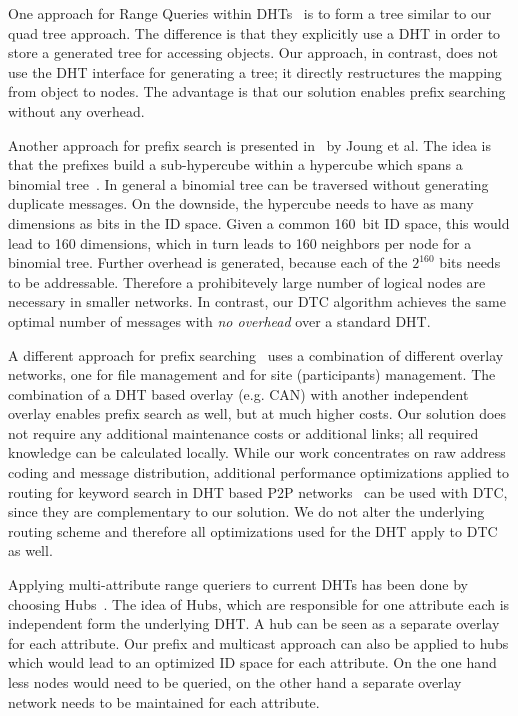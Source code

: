 \documentclass[fleqn,12pt,twoside]{article}
\begin{document}
One approach for Range Queries within DHTs~\cite{data-prefix} is to form a tree similar to
our quad tree approach. The difference is that they explicitly use a
DHT in order to store a generated tree for accessing objects. Our
approach, in contrast, does not use the DHT interface for generating a
tree; it directly restructures the mapping from object to nodes. The
advantage is that our solution enables prefix searching without any
overhead.

Another approach for prefix search is presented
in~\cite{10.1109/P2P.2006.24} by Joung et al. The idea is that the 
prefixes build a sub-hypercube within a hypercube which spans a
binomial tree~\cite{10.1109/ICDCS.2005.44}. In general a binomial tree
can be traversed without generating duplicate messages. On the
downside, the hypercube needs to have as many dimensions as bits in
the ID space. Given a common 160~bit ID space, this would lead to 160
dimensions, which in turn leads to 160 neighbors per node for a
binomial tree. Further overhead is generated, because each of the
$2^{160}$ bits needs to be addressable. Therefore a prohibitevely large
number of logical nodes are necessary in smaller networks. In
contrast, our DTC algorithm achieves the same optimal number of
messages with \emph{no overhead} over a standard DHT.

A different approach for prefix searching~\cite{872053}  uses
a combination of different overlay networks, one  for file
management and for site (participants) management.  The
combination of a DHT based overlay (e.g. CAN) with another independent
overlay enables prefix search as well, but at much higher costs. Our
solution does not require any additional maintenance costs or
additional links; all required knowledge can be calculated locally.
While our work concentrates on raw address coding and message
distribution, additional performance optimizations applied to routing
for keyword search in DHT based P2P
networks~\cite{reynolds2003epp,gnawali2002kss} can be used with DTC,
since they are complementary to our solution. We do not alter the
underlying routing scheme and therefore all optimizations used for the
DHT apply to DTC as well.

Applying multi-attribute range queriers to current DHTs has been done by choosing Hubs~\cite{bharambe2004mss}.
The idea of Hubs, which are responsible for one attribute each is independent form the underlying DHT. A hub
can be seen as a separate overlay for each attribute. Our prefix and multicast approach can also be applied to hubs which would lead 
to an optimized ID space for each attribute. On the one hand less nodes would need to be queried, on the other hand a separate overlay network needs to be maintained for each attribute.
\end{document}
